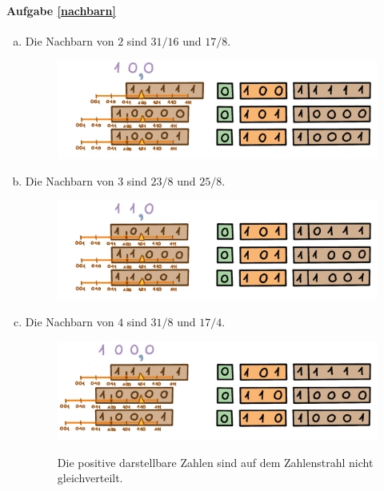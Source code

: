 \paragraph{Aufgabe \ref{nachbarn}}

\begin{enumerate}[(a)]
\item Die Nachbarn von \(2\) sind \(31/16\) und \(17/8\).
\begin{figure}[H]
\centering
\includegraphics[width=\linewidth]{Pictures/Nachbarn2.png}
\end{figure}

\item Die Nachbarn von \(3\) sind \(23/8\) und \(25/8\).
\begin{figure}[H]
\centering
\includegraphics[width=\linewidth]{Pictures/Nachbarn3.png}
\end{figure}

\item Die Nachbarn von \(4\) sind \(31/8\) und \(17/4\).
\begin{figure}[H]
\centering
\includegraphics[width=\linewidth]{Pictures/Nachbarn4.png}

Die positive darstellbare Zahlen sind auf dem Zahlenstrahl nicht gleichverteilt.
\end{figure}

\end{enumerate}

